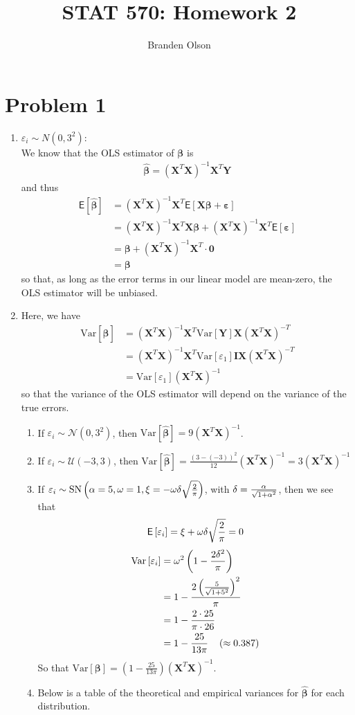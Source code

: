 \documentclass[11pt]{article}
\newcommand*\htab{\hspace{4 mm}}
\newcommand*\ba{\[ \begin{aligned}}
\newcommand*\ea{\end{aligned} \]}
\newcommand*\eps{\epsilon}
\newcommand*\E[1]{\mathsf{E}\left[#1\right]}
\newcommand*\Var[1]{\text{Var}\left[#1\right]}
\newcommand*\estim[1]{\widehat{#1}}
\newcommand*\bI{\mathbf{I}}
\newcommand*\bX{\mathbf{X}}
\newcommand*\bY{\mathbf{Y}}
\newcommand*\bzero{\mathbf{0}}
\newcommand*\bbeta{\boldsymbol{\beta}}
\newcommand*\beps{\boldsymbol{\varepsilon}}
\renewcommand\;{\,}
\renewcommand\epsilon{\varepsilon}
\begin{document}
\title{STAT 570: Homework 2}
\author{Branden Olson}
\date{}
\maketitle

\section*{Problem 1}
\begin{enumerate}[label=(\roman*)]
\item
$\eps_i \sim N(0, 3^2)$:
\\
We know that the OLS estimator of $\bbeta$ is
\ba
\estim{\bbeta} = (\bX^T \bX)^{-1} \bX^T \bY
\ea
and thus
\ba
\E{\estim{\bbeta}} & = (\bX^T \bX)^{-1} \bX^T \E{ \bX \bbeta + \beps} \\
	& = (\bX^T \bX)^{-1} \bX^T \bX \bbeta + (\bX^T \bX)^{-1} \bX^T \E{\beps} \\
	& = \bbeta + (\bX^T \bX)^{-1} \bX^T \cdot \bzero \\
	& = \bbeta
\ea
so that, as long as the error terms in our linear model are mean-zero, the OLS estimator will be unbiased. 
\item
Here, we have
\ba
\Var{\estim{\bbeta}} & = 
	(\bX^T \bX)^{-1} \bX^T \Var{\bY} \bX (\bX^T \bX)^{-T} \\
	& = (\bX^T \bX)^{-1} \bX^T \Var{\eps_1} \bI \bX (\bX^T \bX)^{-T} \\
	& = \Var{\eps_1} (\bX^T \bX)^{-1}
\ea
so that the variance of the OLS estimator will depend on the variance of the true errors. 
\begin{enumerate}[label=(\roman*)]
\item If $\eps_i \sim \mathcal N(0, 3^2)$, then
$\Var{\estim{\bbeta}} = 9 (\bX^T \bX)^{-1}$.
\item If $\eps_i \sim \mathcal U(-3, 3)$, then 
$\Var{\estim{\bbeta}} = \frac{(3 - (-3))^2}{12} (\bX^T \bX)^{-1}
= 3 (\bX^T \bX)^{-1}$
\item If 
$\eps_i \sim \text{SN}\left(\alpha=5, \omega=1, \xi=-\omega \delta \sqrt{2\over\pi}\right)$, with $\delta = {\alpha \over \sqrt{1 + \alpha^2}}$, then we see that
\ba
\E{\eps_i} = \xi + \omega \delta \sqrt{2\over\pi} = 0
\ea
\ba
\Var{\eps_i} & = \omega^2 \left(1 - \frac{2\delta^2}{\pi}\right) \\
	& = 1 - \frac{2 \left(\frac{5}{\sqrt{1 + 5^2}}\right)^2}{ \pi} \\
	& = 1 - \frac{2 \cdot 25}{\pi \cdot 26} \\
	& = 1 - \frac{25}{13\pi}  \htab (\approx 0.387)
\ea
So that $\Var{\bbeta} = \left(1 - \frac{25}{13\pi}\right) (\bX^T \bX)^{-1}$. 
\item
Below is a table of the theoretical and empirical variances for $\estim{\bbeta}$ for each distribution.

\end{enumerate}

\end{enumerate}
\end{document}
